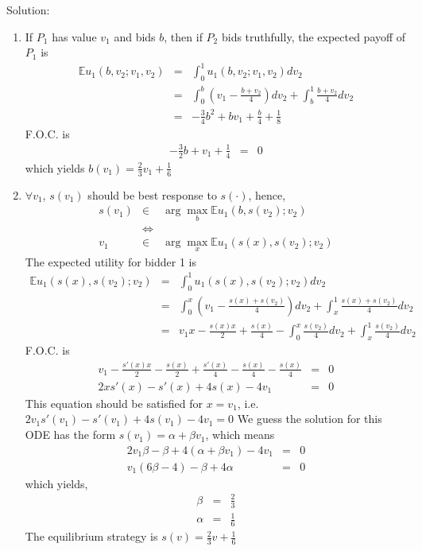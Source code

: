 \documentclass[a4paper]{article}
\begin{document}
\begin{framed}
Solution:

\begin{enumerate}
	\item If $P_1$ has value $v_{1}$ and bids $b$, then if $P_2$ bids truthfully, the expected payoff of $P_1$ is 
		\begin{eqnarray*}
			\mathbb{E}u_{1}(b,v_{2};v_{1},v_{2})	&=&		\int _{0}^{1}u_{1}(b,v_{2};v_{1},v_{2})dv_{2}	\\
			&=&\int_{0}^{b}\left(v_{1}-\frac{b+v_{2}}{4}\right)dv_{2} + \int_{b}^{1}\frac{b+v_{2}}{4}dv_{2}		\\
			&=&-\frac{3}{4}b^{2}+bv_{1}+\frac{b}{4}+\frac{1}{8}
		\end{eqnarray*}
F.O.C. is 	
		\begin{eqnarray*}
		-\frac{3}{2}b+v_{1}+\frac{1}{4}	&=&		0	
		\end{eqnarray*}
which yields $b(v_{1})=\frac{2}{3}v_{1}+\frac{1}{6}$

	\item $\forall v_{1}$, $s(v_{1})$ should be best response to $s(\cdot)$, hence,
		\begin{eqnarray*}
			s(v_{1})	&\in& 	\arg\max_{b}\mathbb{E}u_{1}(b,s(v_{2});v_{2})	\\
					&\Leftrightarrow&		\\
			v_{1}	&\in&	\arg\max_{x}\mathbb{E}u_{1}(s(x),s(v_{2});v_{2})
		\end{eqnarray*}
The expected utility for bidder 1 is 
		\begin{eqnarray*}
			\mathbb{E}u_{1}(s(x),s(v_{2});v_{2})	&=&		\int _{0}^{1}u_{1}(s(x),s(v_{2});v_{2})dv_{2}	\\
			&=&\int_{0}^{x}\left(v_{1}-\frac{s(x)+s(v_{2})}{4}\right)dv_{2} + \int_{x}^{1}\frac{s(x)+s(v_{2})}{4}dv_{2}		\\
			&=&v_{1}x-\frac{s(x)x}{2}+\frac{s(x)}{4}-\int_{0}^{x}\frac{s(v_{2})}{4}dv_{2}+\int_{x}^{1}\frac{s(v_{2})}{4}dv_{2}
		\end{eqnarray*}
F.O.C. is 
		\begin{eqnarray*}
		v_{1}-\frac{s'(x)x}{2}-\frac{s(x)}{2}+\frac{s'(x)}{4}-\frac{s(x)}{4}-\frac{s(x)}{4}	&=&		0	\\
		2xs'(x)-s'(x)+4s(x)-4v_{1}		&=&		0	
		\end{eqnarray*}
This equation should be satisfied for $x=v_{1}$, i.e. $2v_{1}s'(v_{1})-s'(v_{1})+4s(v_{1})-4v_{1}=0$
We guess the solution for this ODE has the form $s(v_{1})=\alpha+\beta v_{1}$, which means 
		\begin{eqnarray*}
		2v_{1}\beta-\beta+4\left(\alpha+\beta v_{1}\right)-4v_{1}		&=&		0	\\
		v_{1}(6\beta-4)-\beta+4\alpha	&=&		0	
		\end{eqnarray*}
which yields, 
		\begin{eqnarray*}
		\beta	&=&		\frac{2}{3}	\\
		\alpha	&=&		\frac{1}{6}
		\end{eqnarray*}
The equilibrium strategy is $s(v)=\frac{2}{3}v+\frac{1}{6}$
\end{enumerate}
\end{framed}
\end{document}
